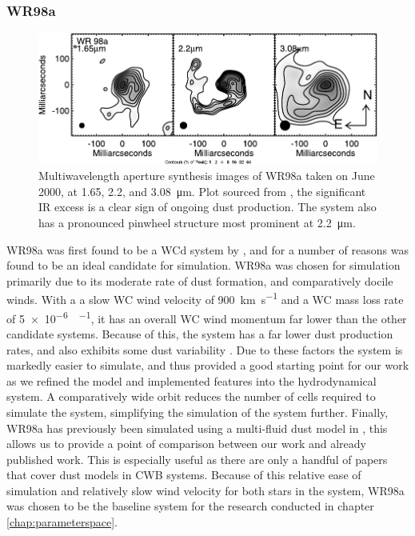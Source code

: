 \subsubsection{WR98a}

\begin{figure}[h]
  \centering
  \includegraphics{assets/systems/wr98a-monnier2007.pdf}
  \caption[\textit{Multiwavelength image of WR98a \parencite{monnierKeckAperturemaskingExperiment2007}}]{Multiwavelength aperture synthesis images of WR98a taken on June  2000, at 1.65, 2.2, and \SI{3.08}{\micro\metre}. Plot sourced from \textcite{monnierKeckAperturemaskingExperiment2007}, the significant IR excess is a clear sign of ongoing dust production. The system also has a pronounced pinwheel structure most prominent at \SI{2.2}{\micro\metre}.}
\end{figure}


WR98a was first found to be a WCd system by \textcite{monnierPinwheelNebulaWR1999}, and for a number of reasons was found to be an ideal candidate for simulation.
WR98a was chosen for simulation primarily due to its moderate rate of dust formation, and comparatively docile winds.
With a a slow WC wind velocity of \SI{900}{\kilo\metre\per\second} and a WC mass loss rate of \SI{5e-6}{\solarmass\per\year}, it has an overall WC wind momentum far lower than the other candidate systems.
Because of this, the system has a far lower dust production rates, and also exhibits some dust variability \parencite{lauRevisitingImpactDust2020}.
Due to these factors the system is markedly easier to simulate, and thus provided a good starting point for our work as we refined the model and implemented features into the hydrodynamical system.
A comparatively wide orbit reduces the number of cells required to simulate the system, simplifying the simulation of the system further.
Finally, WR98a has previously been simulated using a multi-fluid dust model in \textcite{hendrix_pinwheels_2016}, this allows us to provide a point of comparison between our work and already published work.
This is especially useful as there are only a handful of papers that cover dust models in CWB systems.
Because of this relative ease of simulation and relatively slow wind velocity for both stars in the system, WR98a was chosen to be the baseline system for the research conducted in chapter \ref{chap:parameterspace}.

